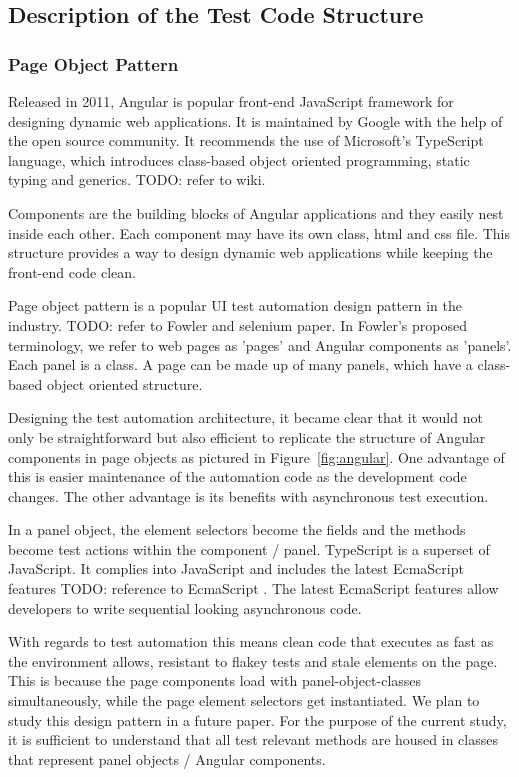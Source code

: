 \documentclass[conference]{IEEEtran}
\newcommand{\todo}[1]{}
\renewcommand{\todo}[1]{{\color{red} TODO: {#1}}}
\begin{document}
\subsection{Description of the Test Code Structure}

	\subsubsection{Page Object Pattern}

	Released in 2011, Angular is popular front-end JavaScript framework for designing dynamic web applications.
	It is maintained by Google with the help of the open source community.
	It recommends the use of Microsoft's TypeScript language, which introduces class-based object oriented programming, static typing and generics. \todo{refer to wiki}.

	Components are the building blocks of Angular applications and they easily nest inside each other.
	Each component may have its own class, html and css file. This structure provides a way to design dynamic web applications while keeping the front-end code clean. 

	Page object pattern is a popular UI test automation design pattern in the industry. \todo{refer to Fowler and selenium paper}.
	In Fowler's proposed terminology, we refer to web pages as 'pages' and Angular components as 'panels'.
	Each panel is a class. A page can be made up of many panels, which have a class-based object oriented structure.   

	Designing the test automation architecture, it became clear that it would not only be straightforward but also efficient to replicate the structure of Angular components in page objects as pictured in Figure~\ref{fig:angular}.
	One advantage of this is easier maintenance of the automation code as the development code changes.
	The other advantage is its benefits with asynchronous test execution.

	In a panel object, the element selectors become the fields and the methods become test actions within the component / panel. 
	TypeScript is a superset of JavaScript. It complies into JavaScript and includes the latest EcmaScript features \todo{reference to EcmaScript} .
	The latest EcmaScript features allow developers to write sequential looking asynchronous code.

	With regards to test automation this means clean code that executes as fast as the environment allows, resistant to flakey tests and stale elements on the page. 
	This is because the page components load with panel-object-classes simultaneously, while the page element selectors get instantiated.
	We plan to study this design pattern in a future paper. For the purpose of the current study, it is sufficient to understand that all test relevant methods are housed in classes that represent panel objects / Angular components.
	
\end{document}
